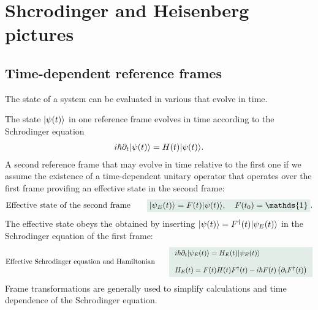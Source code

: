 \section{Shcrodinger and Heisenberg pictures}
%
\subsection{Time-dependent reference frames}
The state of a system can be evaluated in various  that evolve in time. 

The state $|\psi(t)\rangle$ in one reference frame evolves in time according to the Schrodinger equation
\begin{align*}
    i\hbar\partial_t|\psi(t)\rangle=H(t)|\psi(t)\rangle.
\end{align*}
A second reference frame that may evolve in time relative to the first one if we assume the existence of a time-dependent unitary operator that operates over 
the first frame provifing an effective state in the second frame: 
\begin{align}
    \text{Effective state of the second frame}\qquad\highlight{\ket{\psi_E(t)}=F(t)\ket{\psi(t)},\quad F(t_0)=\mathds{1}}.
\end{align}
The effective state obeys the  obtained by inserting $|\psi(t)\rangle=F^\dagger(t)|\psi_E(t)\rangle$ in the Schrodinger equation of the first frame:
\begin{align}
    \text{Effective Schrodinger equation and Hamiltonian}\qquad\highlight{\begin{array}{l}
        i\hbar\partial_t\ket{\psi_E(t)}=H_E(t)\ket{\psi_E(t)}\\\\
        H_E(t)=F(t)H(t)F^\dagger(t)-i\hbar F(t)\left(\partial_tF^\dagger(t)\right)
    \end{array}}
\end{align}
Frame transformations are generally used to simplify calculations and time dependence of the Schrodinger equation.
